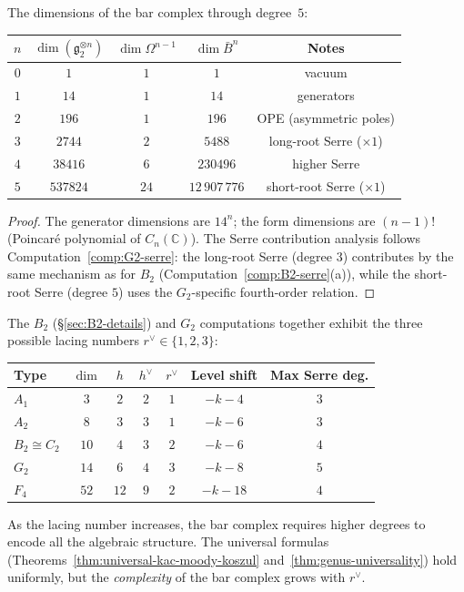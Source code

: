 \begin{proposition}
\label{prop:G2-bar-dims}
The dimensions of the bar complex through degree~$5$:
\begin{center}
\renewcommand{\arraystretch}{1.2}
\begin{tabular}{c|ccc|c}
$n$ & $\dim(\mathfrak{g}_2^{\otimes n})$ &
$\dim \Omega^{n-1}$ & $\dim \bar{B}^n$ &
Notes \\
\hline
$0$ & $1$ & $1$ & $1$ & vacuum \\
$1$ & $14$ & $1$ & $14$ & generators \\
$2$ & $196$ & $1$ & $196$ & OPE (asymmetric poles) \\
$3$ & $2744$ & $2$ & $5488$ & long-root Serre ($\times 1$) \\
$4$ & $38416$ & $6$ & $230496$ & higher Serre \\
$5$ & $537824$ & $24$ & $12\,907\,776$ & short-root Serre ($\times 1$)
\end{tabular}
\end{center}
\end{proposition}

\begin{proof}
The generator dimensions are $14^n$; the form dimensions
are $(n-1)!$ (Poincar\'{e} polynomial of $C_n(\mathbb{C})$).
The Serre contribution analysis follows
Computation~\ref{comp:G2-serre}: the long-root Serre (degree $3$)
contributes by the same mechanism as for $B_2$
(Computation~\ref{comp:B2-serre}(a)), while the short-root
Serre (degree $5$) uses the $G_2$-specific fourth-order relation.
\end{proof}

\begin{remark}\label{rem:G2-context}
The $B_2$ (\S\ref{sec:B2-details}) and $G_2$ computations together
exhibit the three possible lacing numbers
$r^\vee \in \{1, 2, 3\}$:
\begin{center}
\renewcommand{\arraystretch}{1.2}
\begin{tabular}{lcccccc}
\textbf{Type} & $\dim$ & $h$ & $h^\vee$ & $r^\vee$ &
\textbf{Level shift} & \textbf{Max Serre deg.} \\
\hline
$A_1$ & $3$ & $2$ & $2$ & $1$ & $-k-4$ & $3$ \\
$A_2$ & $8$ & $3$ & $3$ & $1$ & $-k-6$ & $3$ \\
$B_2 \cong C_2$ & $10$ & $4$ & $3$ & $2$ & $-k-6$ & $4$ \\
$G_2$ & $14$ & $6$ & $4$ & $3$ & $-k-8$ & $5$ \\
$F_4$ & $52$ & $12$ & $9$ & $2$ & $-k-18$ & $4$
\end{tabular}
\end{center}
As the lacing number increases, the bar complex requires higher
degrees to encode all the algebraic structure. The universal
formulas (Theorems~\ref{thm:universal-kac-moody-koszul}
and~\ref{thm:genus-universality}) hold uniformly, but the
\emph{complexity} of the bar complex grows with $r^\vee$.
\end{remark}

